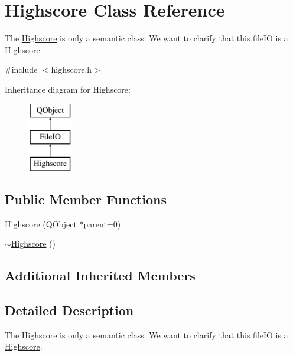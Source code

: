 \hypertarget{class_highscore}{\section{Highscore Class Reference}
\label{class_highscore}
}


The \hyperlink{class_highscore}{Highscore} is only a semantic class. We want to clarify that this file\+I\+O is a \hyperlink{class_highscore}{Highscore}.  




{\ttfamily \#include $<$highscore.\+h$>$}

Inheritance diagram for Highscore\+:\begin{figure}[H]
\begin{center}
\leavevmode
\includegraphics[height=3.000000cm]{class_highscore}
\end{center}
\end{figure}
\subsection*{Public Member Functions}
\begin{DoxyCompactItemize}
\item 
\hyperlink{class_highscore_ab760f6092405a654479f34107dc38beb}{Highscore} (Q\+Object $\ast$parent=0)
\item 
\hyperlink{class_highscore_ac22dda9e0f6aeceab3c61035d6e1be5c}{$\sim$\+Highscore} ()
\end{DoxyCompactItemize}
\subsection*{Additional Inherited Members}


\subsection{Detailed Description}
The \hyperlink{class_highscore}{Highscore} is only a semantic class. We want to clarify that this file\+I\+O is a \hyperlink{class_highscore}{Highscore}. 

